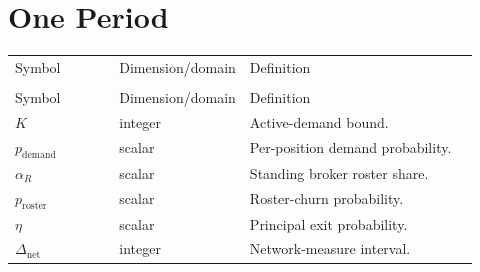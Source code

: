 \documentclass[11pt]{article}
\makeatletter
\newcommand{\diag}[1]{\textcolor{diagblue}{#1}}
\newcommand{\procPeriodUpdate}{PeriodUpdate}
\newenvironment{localvartable}[1]{%
\begingroup
\small
\setlength{\tabcolsep}{4pt}
\renewcommand{\arraystretch}{1.08}
\begin{longtable}{>{\raggedright\arraybackslash}p{0.23\linewidth}
                >{\raggedright\arraybackslash}p{0.18\linewidth}
                >{\raggedright\arraybackslash}p{0.51\linewidth}}
\toprule
\multicolumn{3}{@{}l}{\textit{Local variables for #1}}\\
\midrule
Symbol & Dimension/domain & Definition \\
\midrule
\endfirsthead
\toprule
\multicolumn{3}{@{}l}{\textit{Local variables for #1 (continued)}}\\
\midrule
Symbol & Dimension/domain & Definition \\
\midrule
\endhead
}{%
\bottomrule
\end{longtable}
\endgroup
}
\makeatother
\begin{document}
\section{One Period}

\begin{localvartable}{\procPeriodUpdate}
$K$ & integer & Active-demand bound. \\
$p_{\mathrm{demand}}$ & scalar & Per-position demand probability. \\
$\alpha_R$ & scalar & Standing broker roster share. \\
$p_{\mathrm{roster}}$ & scalar & Roster-churn probability. \\
$\eta$ & scalar & Principal exit probability. \\
\diag{$\Delta_{\mathrm{net}}$} & \diag{integer} & \diag{Network-measure interval.} \\
\end{localvartable}
\end{document}
